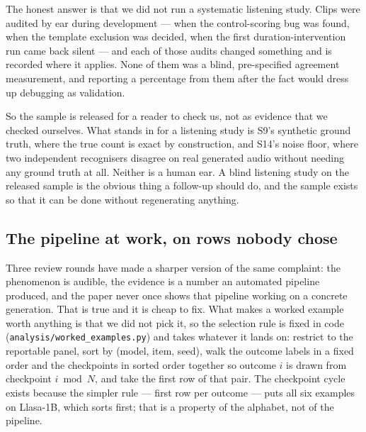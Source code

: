 \documentclass[11pt]{article}
\begin{document}
The honest answer is that we did not run a systematic listening study. Clips were
audited by ear during development --- when the control-scoring bug was found,
when the template exclusion was decided, when the first duration-intervention
run came back silent --- and each of those audits changed something and is
recorded where it applies. None of them was a blind, pre-specified agreement
measurement, and reporting a percentage from them after the fact would dress up
debugging as validation.

So the sample is released for a reader to check us, not as evidence that we
checked ourselves. What stands in for a listening study is S9's synthetic ground
truth, where the true count is exact by construction, and S14's noise floor,
where two independent recognisers disagree on real generated audio without
needing any ground truth at all. Neither is a human ear. A blind listening study
on the released sample is the obvious thing a follow-up should do, and the sample
exists so that it can be done without regenerating anything.

\subsection{The pipeline at work, on rows nobody chose}

Three review rounds have made a sharper version of the same complaint: the
phenomenon is audible, the evidence is a number an automated pipeline produced,
and the paper never once shows that pipeline working on a concrete generation.
That is true and it is cheap to fix. What makes a worked example worth anything
is that we did not pick it, so the selection rule is fixed in code
(\texttt{analysis/worked\_examples.py}) and takes whatever it lands on: restrict
to the reportable panel, sort by (model, item, seed), walk the outcome labels in
a fixed order and the checkpoints in sorted order together so outcome $i$ is
drawn from checkpoint $i \bmod N$, and take the first row of that pair. The
checkpoint cycle exists because the simpler rule --- first row per outcome ---
puts all six examples on Llasa-1B, which sorts first; that is a property of the
alphabet, not of the pipeline.
\end{document}
